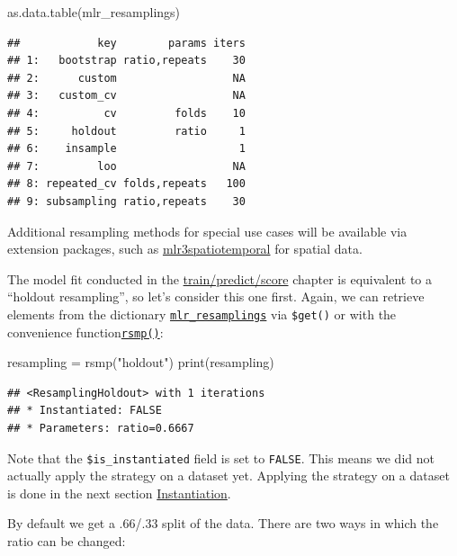 \documentclass[
]{scrbook}
\newenvironment{Shaded}{\begin{snugshade}}{\end{snugshade}}
\newcommand{\FunctionTok}[1]{\textcolor[rgb]{0.00,0.00,0.00}{#1}}
\newcommand{\NormalTok}[1]{#1}
\newcommand{\OtherTok}[1]{\textcolor[rgb]{0.56,0.35,0.01}{#1}}
\newcommand{\StringTok}[1]{\textcolor[rgb]{0.31,0.60,0.02}{#1}}
\renewenvironment{Shaded} {\begin{snugshade}\small} {\end{snugshade}}
\begin{document}
\begin{Shaded}
\begin{Highlighting}[]
\FunctionTok{as.data.table}\NormalTok{(mlr\_resamplings)}
\end{Highlighting}
\end{Shaded}

\begin{verbatim}
##            key        params iters
## 1:   bootstrap ratio,repeats    30
## 2:      custom                  NA
## 3:   custom_cv                  NA
## 4:          cv         folds    10
## 5:     holdout         ratio     1
## 6:    insample                   1
## 7:         loo                  NA
## 8: repeated_cv folds,repeats   100
## 9: subsampling ratio,repeats    30
\end{verbatim}

Additional resampling methods for special use cases will be available via extension packages, such as \href{https://github.com/mlr-org/mlr3spatiotemporal}{mlr3spatiotemporal} for spatial data.

The model fit conducted in the \protect\hyperlink{train-predict}{train/predict/score} chapter is equivalent to a ``holdout resampling'', so let's consider this one first.
Again, we can retrieve elements from the dictionary \href{https://mlr3.mlr-org.com/reference/mlr_resamplings.html}{\texttt{mlr\_resamplings}} via \texttt{\$get()} or with the convenience function\href{https://mlr3.mlr-org.com/reference/mlr_sugar.html}{\texttt{rsmp()}}:

\begin{Shaded}
\begin{Highlighting}[]
\NormalTok{resampling }\OtherTok{=} \FunctionTok{rsmp}\NormalTok{(}\StringTok{"holdout"}\NormalTok{)}
\FunctionTok{print}\NormalTok{(resampling)}
\end{Highlighting}
\end{Shaded}

\begin{verbatim}
## <ResamplingHoldout> with 1 iterations
## * Instantiated: FALSE
## * Parameters: ratio=0.6667
\end{verbatim}

Note that the \texttt{\$is\_instantiated} field is set to \texttt{FALSE}.
This means we did not actually apply the strategy on a dataset yet.
Applying the strategy on a dataset is done in the next section \protect\hyperlink{resampling-inst}{Instantiation}.

By default we get a .66/.33 split of the data.
There are two ways in which the ratio can be changed:
\end{document}
